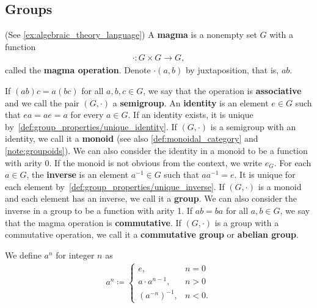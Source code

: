 \subsection{Groups}\label{sec:groups}

\begin{definition}\label{def:group}(See \cref{ex:algebraic_theory_language})
  A \textbf{magma} is a nonempty set \( G \) with a function 
  \begin{align*}
    \cdot: G \times G \to G,
  \end{align*}
  called the \textbf{magma operation}. Denote \( \cdot(a, b) \) by juxtaposition, that is, \( ab \).

  \begin{description}
     If \( (ab)c = a(bc) \) for all \( a, b, c \in G \), we say that the operation is \textbf{associative} and we call the pair \( (G, \cdot) \) a \textbf{semigroup}.
     An \textbf{identity} is an element \( e \in G \) such that \( ea = ae = a \) for every \( a \in G \). If an identity exists, it is unique by~\cref{def:group_properties/unique_identity}. If \( (G, \cdot) \) is a semigroup with an identity, we call it a \textbf{monoid} (see also \cref{def:monoidal_category} and \cref{note:groupoids}). We can also consider the identity in a monoid to be a function with arity 0. If the monoid is not obvious from the context, we write \( e_G \).
     For each \( a \in G \), the \textbf{inverse} is an element \( a^{-1} \in G \) such that \( aa^{-1} = e \). It is unique for each element by~\cref{def:group_properties/unique_inverse}. If \( (G, \cdot) \) is a monoid and each element has an inverse, we call it a \textbf{group}. We can also consider the inverse in a group to be a function with arity 1.
     If \( ab = ba \) for all \( a, b \in G \), we say that the magma operation is \textbf{commutative}. If \( (G, \cdot) \) is a group with a commutative operation, we call it a \textbf{commutative group} or \textbf{abelian group}.
  \end{description}

  We define \( a^n \) for integer \( n \) as
  \begin{align*}
    a^n \coloneqq \begin{cases}
      e, &n = 0 \\
      a \cdot a^{n-1}, &n > 0 \\
      (a^{-n})^{-1}, &n < 0.
    \end{cases}
  \end{align*}


\end{definition}
